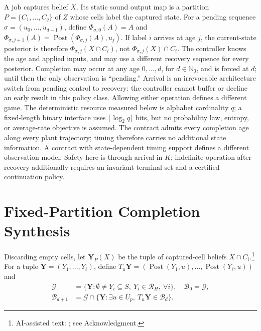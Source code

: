 \documentclass[letterpaper,10pt,conference]{ieeeconf}
\newcommand{\Post}{\operatorname{Post}}
\newcommand{\cR}{\mathcal R}
\newcommand{\cB}{\mathcal B}
\begin{document}
A job captures belief $X$. Its static sound output map is a partition
$P=\{C_1,\ldots,C_q\}$ of $Z$ whose cells label the captured state. For a pending sequence
$\sigma=(u_0,\ldots,u_{d-1})$, define
$\Phi_{\sigma,0}(A)=A$ and
$\Phi_{\sigma,j+1}(A)=\Post(\Phi_{\sigma,j}(A),u_j)$.
If label $i$ arrives at age $j$, the current-state posterior is therefore
$\Phi_{\sigma,j}(X\cap C_i)$, not $\Phi_{\sigma,j}(X)\cap C_i$.
The controller knows the age and applied inputs, and may use a different recovery sequence for
every posterior. Completion may occur at any age $0,\ldots,d$, for $d\in\mathbb N_0$, and is forced at $d$; until then the
only observation is ``pending.'' Arrival is an irrevocable architecture switch from pending
control to recovery: the controller cannot buffer or decline an early result in this policy class.
Allowing either operation defines a different game. The deterministic resource measured below is
alphabet cardinality $q$; a fixed-length binary interface uses $\lceil\log_2q\rceil$ bits, but no
probability law, entropy, or average-rate objective is assumed.
The contract admits every completion age along every plant trajectory; timing therefore carries
no additional state information. A contract with state-dependent timing support defines a
different observation model. Safety here is through arrival in $K$; indefinite operation after
recovery additionally requires an invariant terminal set and a certified continuation policy.

\section{Fixed-Partition Completion Synthesis}

Discarding empty cells, let $\mathbf Y_P(X)$ be the tuple of captured-cell beliefs
$X\cap C_i$.\footnote{AI-assisted text: \cite{openai2026codex}; see Acknowledgment.}
For a tuple $\mathbf Y=(Y_1,\ldots,Y_\ell)$, define
$T_u\mathbf Y=(\Post(Y_1,u),\ldots,\Post(Y_\ell,u))$ and
\begin{align}
 \mathcal G&=\{\mathbf Y:\emptyset\ne Y_i\subseteq S,\ Y_i\in\cR_H,\ \forall i\},\quad
 \cB_0=\mathcal G,\nonumber\\
 \cB_{d+1}&=\mathcal G\cap
 \{\mathbf Y:\exists u\in U_p,\ T_u\mathbf Y\in\cB_d\}.   \label{eq:layers}
\end{align}
\end{document}
